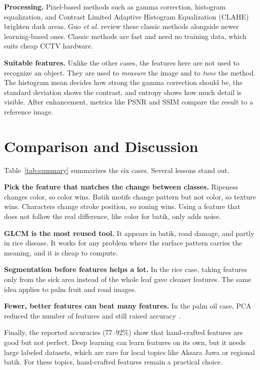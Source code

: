 \documentclass[conference]{IEEEtran}
\begin{document}
\textbf{Processing.} Pixel-based methods such as gamma correction, histogram equalization, and Contrast Limited Adaptive Histogram Equalization (CLAHE) \cite{zuiderveld} brighten dark areas. Guo \emph{et al.} \cite{guo} review these classic methods alongside newer learning-based ones. Classic methods are fast and need no training data, which suits cheap CCTV hardware.

\textbf{Suitable features.} Unlike the other cases, the features here are not used to recognize an object. They are used to \emph{measure} the image and to \emph{tune} the method. The histogram mean decides how strong the gamma correction should be, the standard deviation shows the contrast, and entropy shows how much detail is visible. After enhancement, metrics like PSNR and SSIM compare the result to a reference image.

\section{Comparison and Discussion}
Table~\ref{tab:summary} summarizes the six cases. Several lessons stand out.

\textbf{Pick the feature that matches the change between classes.} Ripeness changes color, so color wins. Batik motifs change pattern but not color, so texture wins. Characters change stroke position, so zoning wins. Using a feature that does not follow the real difference, like color for batik, only adds noise.

\textbf{GLCM is the most reused tool.} It appears in batik, road damage, and partly in rice disease. It works for any problem where the surface pattern carries the meaning, and it is cheap to compute.

\textbf{Segmentation before features helps a lot.} In the rice case, taking features only from the sick area instead of the whole leaf gave cleaner features. The same idea applies to palm fruit and road images.

\textbf{Fewer, better features can beat many features.} In the palm oil case, PCA reduced the number of features and still raised accuracy \cite{fadilah}.

Finally, the reported accuracies (77--92\%) show that hand-crafted features are good but not perfect. Deep learning can learn features on its own, but it needs large labeled datasets, which are rare for local topics like Aksara Jawa or regional batik. For these topics, hand-crafted features remain a practical choice.
\end{document}
